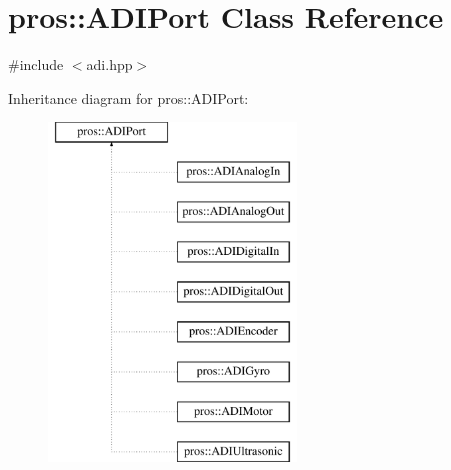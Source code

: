 \hypertarget{classpros_1_1ADIPort}{}\section{pros\+:\+:A\+D\+I\+Port Class Reference}
\label{classpros_1_1ADIPort}


{\ttfamily \#include $<$adi.\+hpp$>$}

Inheritance diagram for pros\+:\+:A\+D\+I\+Port\+:\begin{figure}[H]
\begin{center}
\leavevmode
\includegraphics[height=9.000000cm]{classpros_1_1ADIPort}
\end{center}
\end{figure}
